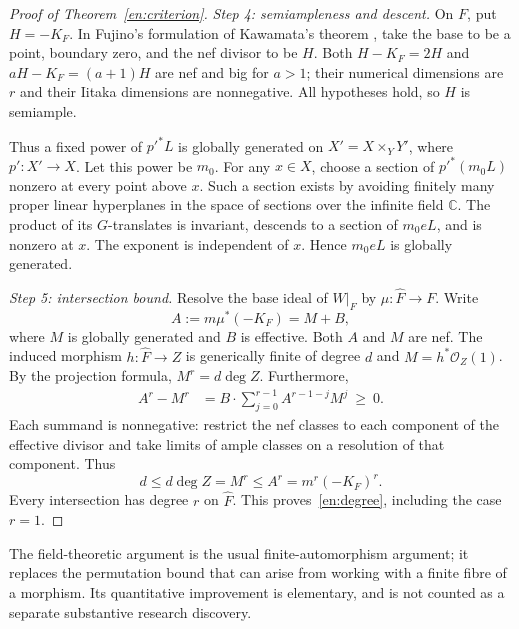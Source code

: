 \documentclass[12pt]{amsart}
\theoremstyle{definition}
\theoremstyle{remark}
\numberwithin{equation}{section}
\newcommand{\cO}{\mathcal{O}}
\newcommand{\C}{\mathbb{C}}
\begin{document}
\begin{proof}[Proof of Theorem~\ref{en:criterion}]
\textit{Step 4: semiampleness and descent.}
On $F$, put $H=-K_F$. In Fujino's formulation of Kawamata's theorem \cite[Theorem 1.1]{en:Fuj}, take the base to be a point, boundary zero, and the nef divisor to be $H$. Both $H-K_F=2H$ and $aH-K_F=(a+1)H$ are nef and big for $a>1$; their numerical dimensions are $r$ and their Iitaka dimensions are nonnegative. All hypotheses hold, so $H$ is semiample.

Thus a fixed power of $p'^*L$ is globally generated on $X'=X\times_Y Y'$, where $p':X'\to X$. Let this power be $m_0$. For any $x\in X$, choose a section of $p'^*(m_0L)$ nonzero at every point above $x$. Such a section exists by avoiding finitely many proper linear hyperplanes in the space of sections over the infinite field $\C$. The product of its $G$-translates is invariant, descends to a section of $m_0eL$, and is nonzero at $x$. The exponent is independent of $x$. Hence $m_0eL$ is globally generated.

\textit{Step 5: intersection bound.}
Resolve the base ideal of $W|_F$ by $\mu:\widehat F\to F$. Write
\[
 A:=m\mu^*(-K_F)=M+B,
\]
where $M$ is globally generated and $B$ is effective. Both $A$ and $M$ are nef. The induced morphism $h:\widehat F\to Z$ is generically finite of degree $d$ and $M=h^*\cO_Z(1)$. By the projection formula, $M^r=d\deg Z$. Furthermore,
\begin{align*}
 A^r-M^r
 &=B\cdot\sum_{j=0}^{r-1}A^{r-1-j}M^j\ \geq\ 0.
\end{align*}
Each summand is nonnegative: restrict the nef classes to each component of the effective divisor and take limits of ample classes on a resolution of that component. Thus
\[
 d\leq d\deg Z=M^r\leq A^r=m^r(-K_F)^r.
\]
Every intersection has degree $r$ on $\widehat F$. This proves~\eqref{en:degree}, including the case $r=1$.
\end{proof}

The field-theoretic argument is the usual finite-automorphism argument; it replaces the permutation bound that can arise from working with a finite fibre of a morphism. Its quantitative improvement is elementary, and is not counted as a separate substantive research discovery.
\end{document}
